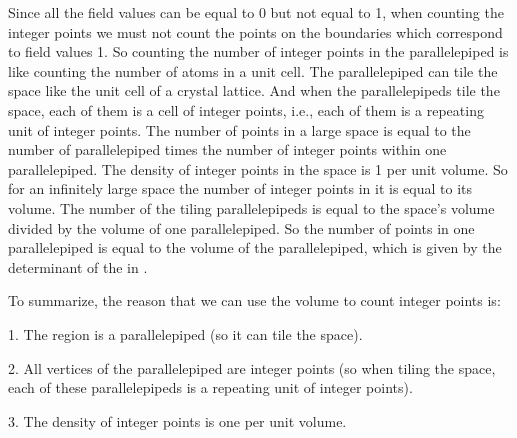 \begin{description}
{Since all the field values can be equal to 0 but not equal to 1, when
counting the integer points we must not count the points on the
boundaries which correspond to field values 1. So counting the number of
integer points in the parallelepiped is like counting the number of atoms
in a unit cell. The parallelepiped can tile the space like the unit cell
of a crystal lattice. And when the parallelepipeds tile the space, each
of them is a cell of integer points, i.e., each of them is a repeating
unit of integer points. The number of points in a large space is equal to
the number of parallelepiped times the number of integer points within
one parallelepiped. The density of integer points in the space is 1 per
unit volume. So for an infinitely large space the number of integer
points in it is equal to its volume. The number of the tiling
parallelepipeds is equal to the space's volume divided by the volume of
one parallelepiped. So the number of points in one parallelepiped is
equal to the volume of the parallelepiped, which is given by the
determinant of the {\jacobianOrb} in .

To summarize, the reason that we can use the volume to count integer points is:

1. The region is a parallelepiped (so it can tile the space).

2. All vertices of the parallelepiped are integer points (so when tiling
the space, each of these parallelepipeds is a repeating unit of integer
points).

3. The density of integer points is one per unit volume.
}

\end{description}
